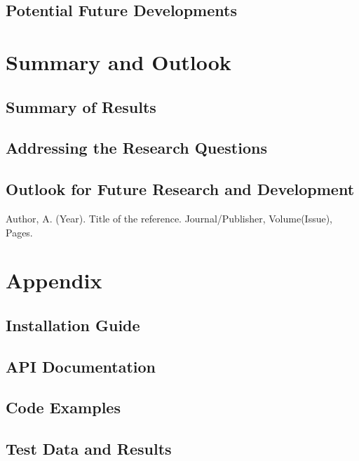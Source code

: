 \documentclass{article}
\begin{document}
\subsection{Potential Future Developments}

\newpage

\section{Summary and Outlook}

\subsection{Summary of Results}
\subsection{Addressing the Research Questions}
\subsection{Outlook for Future Research and Development}

\newpage

\begin{thebibliography}{99}
 Author, A. (Year). Title of the reference. Journal/Publisher, Volume(Issue), Pages.
\end{thebibliography}

\newpage

\appendix
\section*{Appendix}
\subsection*{Installation Guide}
\subsection*{API Documentation}
\subsection*{Code Examples}
\subsection*{Test Data and Results}
\end{document}
